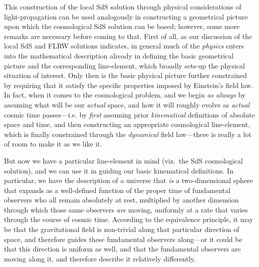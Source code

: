 \documentclass[11pt]{article}
\begin{document}
\begin{appendix}
This construction of the local SdS solution through physical considerations of light-propagation can be used analogously in constructing a geometrical picture upon which the cosmological SdS solution can be based; %
however, some more remarks are necessary before coming to that. First of all, as our discussion of the local SdS and FLRW solutions indicates, in general much of the \textit{physics} enters into the mathematical description already in defining the basic geometrical picture and the corresponding line-element, which broadly sets-up the physical situation of interest. Only then is the basic physical picture further constrained by requiring that it satisfy the specific properties imposed by Einstein's field law. In fact, when it comes to the cosmological problem, and we begin \textit{as always} by assuming what will be our \textit{actual} space, and how it will roughly evolve as \textit{actual} cosmic time passes---i.e. by \textit{first} assuming prior \textit{kinematical} definitions of absolute space and time, and then constructing an appropriate cosmological line-element, which is finally constrained through the \textit{dynamical} field law---there is really a lot of room to make it as we like it.

But now we have a particular line-element in mind (viz.\ the SdS cosmological solution), and we can use it in guiding our basic kinematical definitions. In particular, we have the description of a universe that \textit{is} a two-dimensional sphere that expands as a well-defined function of the proper time of fundamental observers who all remain absolutely at rest, multiplied by another dimension through which those same observers \textit{are} moving, uniformly at a rate that varies through the course of cosmic time. According to the equivalence principle, it may be that the gravitational field is non-trivial along that particular direction of space, and therefore guides these fundamental observers along---or it could be that this direction is uniform as well, and that the fundamental observers are moving along it, and therefore describe it relatively differently. 


\end{appendix}
\end{document}
